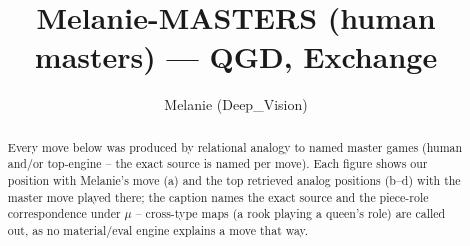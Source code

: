 \documentclass[11pt]{article}
\title{Melanie-MASTERS (human masters) — QGD, Exchange}
\author{Melanie (Deep\_Vision)}
\date{}
\begin{document}
\maketitle

\begin{abstract}Every move below was produced by relational analogy to named master games (human and/or top-engine -- the exact source is named per move). Each figure shows our position with Melanie's move (a) and the top retrieved analog positions (b--d) with the master move played there; the caption names the exact source and the piece-role correspondence under $\mu$ -- cross-type maps (a rook playing a queen's role) are called out, as no material/eval engine explains a move that way.\end{abstract}

\begin{figure}[p]\centering
\begin{subfigure}{0.46\textwidth}\centering
\resizebox{\linewidth}{!}{%
\newchessgame
\chessboard[
  setfen={rnbqk2r/pp2bppp/2p2n2/3p2B1/3P4/2N1P3/PP3PPP/R2QKBNR w KQkq - 0 7},
  showmover=false,
  pgfstyle=straightmove, color=movearrow, markmove={f1-d3}
]}
\caption{}
\end{subfigure}\hfill
\begin{subfigure}{0.46\textwidth}\centering
\resizebox{\linewidth}{!}{%
\newchessgame
\chessboard[
  setfen={r2qk2r/1p2bp2/p2p1np1/3np1Bp/8/1N3P2/PPPQ2PP/1K1R1B1R w kq - 2 15},
  showmover=false,
  pgfstyle=straightmove, color=movearrow, markmove={f1-d3}
]}
\caption{}
\end{subfigure}
\\[4pt]
\begin{subfigure}{0.46\textwidth}\centering
\resizebox{\linewidth}{!}{%
\newchessgame
\chessboard[
  setfen={r2qk2r/1p2bp2/p2p1np1/3np1Bp/8/1N3P2/PPPQ2PP/1K1R1B1R w kq - 2 15},
  showmover=false,
  pgfstyle=straightmove, color=movearrow, markmove={f1-d3}
]}
\caption{}
\end{subfigure}\hfill
\begin{subfigure}{0.46\textwidth}\centering
\resizebox{\linewidth}{!}{%
\newchessgame
\chessboard[
  setfen={r2qk2r/1p2bp2/p2p1np1/3np1Bp/8/1N3P2/PPPQ2PP/1K1R1B1R w kq - 2 15},
  showmover=false,
  pgfstyle=straightmove, color=movearrow, markmove={f1-d3}
]}
\caption{}
\end{subfigure}

\end{figure}
\end{document}

